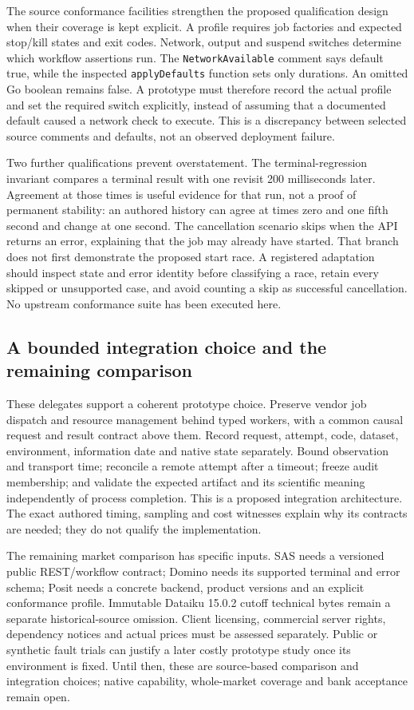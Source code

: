 The source conformance facilities strengthen the proposed qualification
design when their coverage is kept explicit. A profile requires job
factories and expected stop/kill states and exit codes. Network, output and
suspend switches determine which workflow assertions run. The
\texttt{NetworkAvailable} comment says default true, while the inspected
\texttt{applyDefaults} function sets only durations. An omitted Go boolean
remains false. A prototype must therefore record the actual profile and set
the required switch explicitly, instead of assuming that a documented
default caused a network check to execute. This is a discrepancy between
selected source comments and defaults, not an observed deployment failure.
\citep{exec23_workflow_delegates_positgo}

Two further qualifications prevent overstatement. The terminal-regression
invariant compares a terminal result with one revisit 200 milliseconds
later. Agreement at those times is useful evidence for that run, not a proof
of permanent stability: an authored history can agree at times zero and
one fifth second and change at one second. The cancellation scenario skips
when the API returns an error, explaining that the job may already have
started. That branch does not first demonstrate the proposed start race.
A registered adaptation should inspect state and error identity before
classifying a race, retain every skipped or unsupported case, and avoid
counting a skip as successful cancellation. No upstream conformance suite
has been executed here.
\citep{exec23_workflow_delegates_positgo,
exec23_workflow_delegates_reference}

\subsection{A bounded integration choice and the remaining comparison}

These delegates support a coherent prototype choice. Preserve vendor job
dispatch and resource management behind typed workers, with a common causal
request and result contract above them. Record request, attempt, code,
dataset, environment, information date and native state separately. Bound
observation and transport time; reconcile a remote attempt after a timeout;
freeze audit membership; and validate the expected artifact and its
scientific meaning independently of process completion. This is a proposed
integration architecture. The exact authored timing, sampling and cost
witnesses explain why its contracts are needed; they do not qualify the
implementation.

The remaining market comparison has specific inputs. SAS needs a versioned
public REST/workflow contract; Domino needs its supported terminal and error
schema; Posit needs a concrete backend, product versions and an explicit
conformance profile. Immutable Dataiku 15.0.2 cutoff technical bytes remain a
separate historical-source omission. Client licensing, commercial server
rights, dependency notices and actual prices must be assessed separately.
Public or synthetic fault trials can justify a later costly prototype study
once its environment is fixed. Until then, these are source-based comparison
and integration choices; native capability, whole-market coverage and bank
acceptance remain open.
